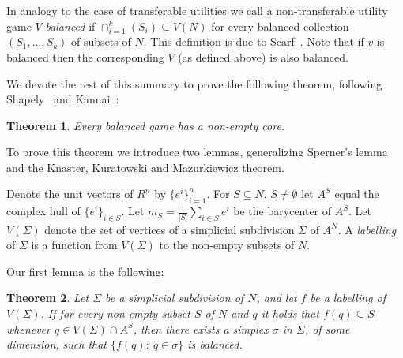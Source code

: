 \documentclass[11pt]{article} \usepackage{amssymb}
\newtheorem{theorem}{Theorem}[section]
\begin{document}
In analogy to the case of transferable utilities we call a
non-transferable utility game $V$ {\em balanced} if $\cap_{i=1}^k(S_i)
\subseteq V(N)$ for every balanced collection $(S_1,\ldots,S_k)$ of
subsets of $N$. This definition is due to
Scarf~\cite{scarf:1967}. Note that if $v$ is balanced then the
corresponding $V$ (as defined above) is also balanced.

We devote the rest of this summary to prove the following theorem,
following Shapely~\cite{shapley:1973} and Kannai~\cite{kannai:1970}:

\begin{theorem}
  \label{thm:0}
  Every balanced game has a non-empty core.
\end{theorem}

To prove this theorem we introduce two lemmas, generalizing Sperner's
lemma and the Knaster, Kuratowski and Mazurkiewicz theorem.

Denote the unit vectors of $R^n$ by $\{e^i\}_{i=1}^n$. For $S
\subseteq N$, $S \neq \emptyset$ let $A^S$ equal the complex hull of
$\{e^i\}_{i \in S}$. Let $m_S = \frac{1}{|S|}\sum_{i \in S}e^i$ be the
barycenter of $A^S$. Let $V(\Sigma)$ denote the set of vertices of a
simplicial subdivision $\Sigma$ of $A^N$. A {\em labelling} of
$\Sigma$ is a function from $V(\Sigma)$ to the non-empty subsets of
$N$.

Our first lemma is the following:
\begin{theorem}
  \label{thm:sperner}
  Let $\Sigma$ be a simplicial subdivision of $N$, and let $f$ be a
  labelling of $V(\Sigma)$. If for every non-empty subset $S$ of $N$
  and $q$ it holds that $f(q) \subseteq S$ whenever $q \in V(\Sigma)
  \cap A^S$, then there exists a simplex $\sigma$ in $\Sigma$, of some
  dimension, such that $\{f(q):\: q \in \sigma\}$ is {\em balanced}.
\end{theorem}
\end{document}
